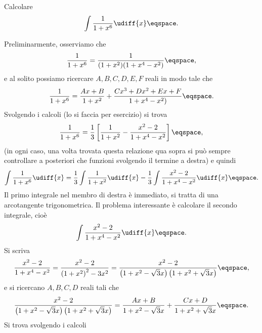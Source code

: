 \begin{Exercise}
Calcolare
\begin{displaymath}
\int \frac{1}{1+x^{6}} \udiff{x} \eqspace .
\end{displaymath}
\end{Exercise}
\begin{Solution}
Preliminarmente, osserviamo che
\begin{displaymath}
\frac{1}{1+x^{6}} = \frac{1}{(1+x^{2})(1+ x^{4} - x^{2})} \eqspace ,
\end{displaymath}
e al solito possiamo ricercare $A,B,C,D,E,F$ reali in modo tale che
\begin{displaymath}
\frac{1}{1+x^{6}} = \frac{Ax + B}{1+x^{2}} + \frac{Cx^3 + Dx^2 + Ex +F}{1+ x^{4}
- x^{2})}  \eqspace .
\end{displaymath}
Svolgendo i calcoli (lo si faccia per esercizio) si trova
\begin{displaymath}
\frac{1}{1+x^{6}} = \frac{1}{3} \left[ 
\frac{1}{1+x^{2}} - \frac{x^{2} -2}{1+x^{4} -x^{2}} \right] \eqspace ,
\end{displaymath}
(in ogni caso, una volta trovata questa relazione qua sopra si pu\`o sempre
controllare a posteriori che funzioni svolgendo il termine a destra)
e quindi
\begin{displaymath}
\int \frac{1}{1+x^6} \udiff{x} = \frac{1}{3} \int \frac{1}{1+x^{2}} \udiff{x} -
\frac{1}{3} \int \frac{x^{2} - 2}{1+x^{4} - x^{2}} \udiff{x} \eqspace .
\end{displaymath}
Il primo integrale nel membro di destra \`e immediato, si tratta di una
arcotangente trigonometrica. Il problema interessante \`e calcolare il secondo
integrale, cio\`e 
\begin{displaymath}
\int \frac{x^{2} -2}{1+x^{4} -x^{2}} \udiff{x} \eqspace .
\end{displaymath}
Si scriva
\begin{displaymath}
\frac{x^{2}-2}{1+x^{4} - x^{2}} =  \frac{x^{2}-2}{\left( 1+ x^{2} \right)^{2} -
3x^{2}} = 
\frac{x^{2} -2}{\left( 1 + x^{2} - \sqrt{3} x \right)\left( 1+x^{2} +
\sqrt{3} x \right)} \eqspace ,
\end{displaymath}
e si ricercano $A,B,C,D$ reali tali che 
\begin{displaymath}
\frac{x^{2} -2}{\left( 1 + x^{2} - \sqrt{3} x \right)\left( 1+x^{2} +
\sqrt{3} x \right)}  = 
\frac{Ax +B}{1+x^{2} - \sqrt{3} x } + \frac{Cx +D}{1 +
x^{2} + \sqrt{3} x } \eqspace .
\end{displaymath}
Si trova svolgendo i calcoli
\begin{eqnarray*}

\end{eqnarray*}
\end{Solution}

